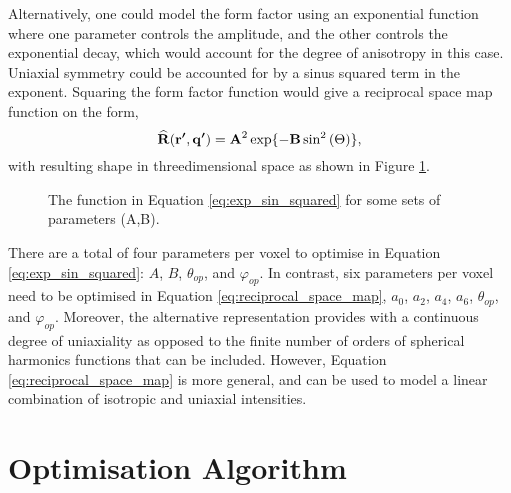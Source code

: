 Alternatively, one could model the form factor using an exponential function where one parameter controls the amplitude, and the other controls the exponential decay,
which would account for the degree of anisotropy in this case. Uniaxial symmetry could be accounted for by a sinus squared term in the exponent.
Squaring the form factor function would give a reciprocal space map function on the form,
\begin{equation}\label{eq:exp_sin_squared}
    \vectorBU{\widehat{R}}(\vectorBU{r'}, \vectorBU{q'}) = \vectorBU{A}^{2} \exp\{-\vectorBU{B} \sin^{2}\left( \vectorgreek{\Theta} \right) \}, %
\end{equation}
with resulting shape in threedimensional space as shown in Figure \ref{fig:exp_sin_squared}.

\begin{figure}
    \centering
    
    
    \caption{The function in Equation \eqref{eq:exp_sin_squared} for some sets of parameters (A,B).}
    \label{fig:exp_sin_squared}
\end{figure}

There are a total of four parameters per voxel to optimise in Equation \eqref{eq:exp_sin_squared}: $A$, $B$, $\theta_{op}$, and $\varphi_{op}$.
In contrast, six parameters per voxel need to be optimised in Equation \eqref{eq:reciprocal_space_map},
$a_{0}$, $a_{2}$, $a_{4}$, $a_{6}$, $\theta_{op}$, and $\varphi_{op}$.
Moreover, the alternative representation provides with a continuous degree of uniaxiality
as opposed to the finite number of orders of spherical harmonics functions that can be included.
However, Equation \eqref{eq:reciprocal_space_map} is more general, and can be used to model a linear combination of isotropic and uniaxial intensities.


\section{Optimisation Algorithm}

